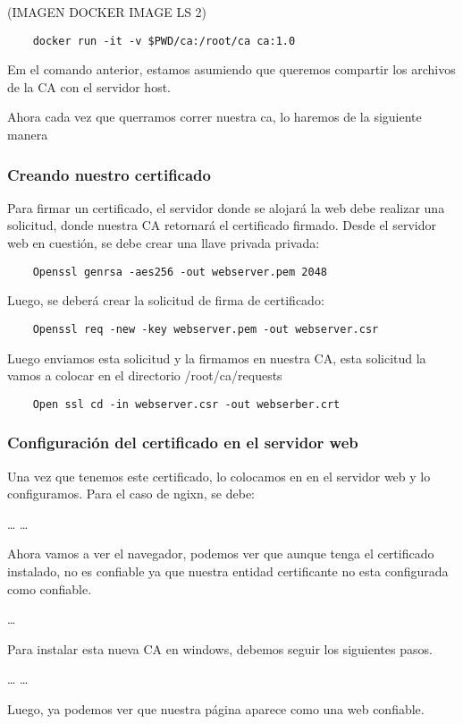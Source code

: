 (IMAGEN DOCKER IMAGE LS 2)

\begin{verbatim}
    docker run -it -v $PWD/ca:/root/ca ca:1.0
\end{verbatim}

Em el comando anterior, estamos asumiendo que queremos compartir los archivos de la CA con el servidor 
host.

Ahora cada vez que querramos correr nuestra ca, lo haremos de la siguiente manera 



\subsubsection*{Creando nuestro certificado}

Para firmar un certificado, el servidor donde se alojará la web debe realizar una solicitud, 
donde nuestra CA retornará el certificado firmado. Desde el servidor web en cuestión, se debe 
crear una llave privada privada:

\begin{verbatim}
    Openssl genrsa -aes256 -out webserver.pem 2048
\end{verbatim}

\noindent Luego, se deberá crear la solicitud de firma de certificado:
\begin{verbatim}
    Openssl req -new -key webserver.pem -out webserver.csr
\end{verbatim}

\noindent Luego enviamos esta solicitud y la firmamos en nuestra CA, esta solicitud la vamos a colocar en el directorio /root/ca/requests
\begin{verbatim}
    Open ssl cd -in webserver.csr -out webserber.crt
\end{verbatim}

\subsubsection*{Configuración del certificado en el servidor web}
\noindent Una vez que tenemos este certificado, lo colocamos en en el servidor web y lo configuramos. Para el caso de ngixn, se debe:

…
…

\noindent Ahora vamos a ver el navegador, podemos ver que aunque tenga el certificado instalado, no es confiable ya que nuestra entidad certificante no esta configurada como confiable.

…

\noindent Para instalar esta nueva CA en windows, debemos seguir los siguientes pasos.

…
…

\noindent Luego, ya podemos ver que nuestra página aparece como una web confiable.




